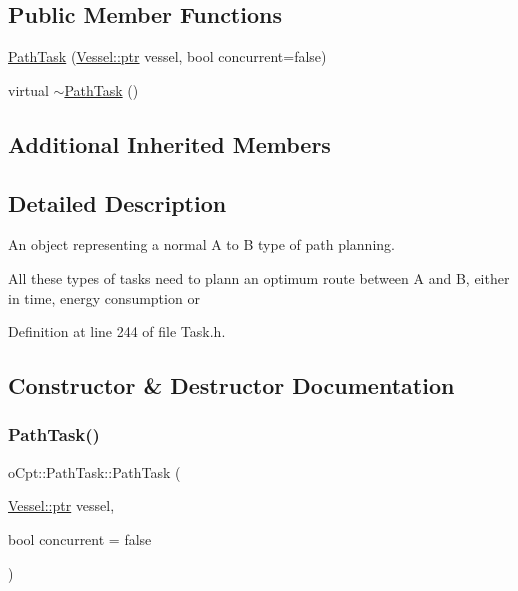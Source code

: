 \subsection*{Public Member Functions}
\begin{DoxyCompactItemize}
\item 
\hyperlink{classo_cpt_1_1_path_task_a3ea7676103564aaaca3b933c95c3f6c6}{Path\+Task} (\hyperlink{classo_cpt_1_1i_vessel_a43711a596f3bdfd0ca732ed3901edc97}{Vessel\+::ptr} vessel, bool concurrent=false)
\item 
virtual \hyperlink{classo_cpt_1_1_path_task_a957810982a8f94b7c0b942e348e86467}{$\sim$\+Path\+Task} ()
\end{DoxyCompactItemize}
\subsection*{Additional Inherited Members}


\subsection{Detailed Description}
An object representing a normal A to B type of path planning. 

All these types of tasks need to plann an optimum route between A and B, either in time, energy consumption or 

Definition at line 244 of file Task.\+h.



\subsection{Constructor \& Destructor Documentation}
\hypertarget{classo_cpt_1_1_path_task_a3ea7676103564aaaca3b933c95c3f6c6}{}\label{classo_cpt_1_1_path_task_a3ea7676103564aaaca3b933c95c3f6c6} 
\subsubsection{\texorpdfstring{Path\+Task()}{PathTask()}}
{\footnotesize\ttfamily o\+Cpt\+::\+Path\+Task\+::\+Path\+Task (\begin{DoxyParamCaption}\item[{\hyperlink{classo_cpt_1_1i_vessel_a43711a596f3bdfd0ca732ed3901edc97}{Vessel\+::ptr}}]{vessel,  }\item[{bool}]{concurrent = {\ttfamily false} }\end{DoxyParamCaption})}


